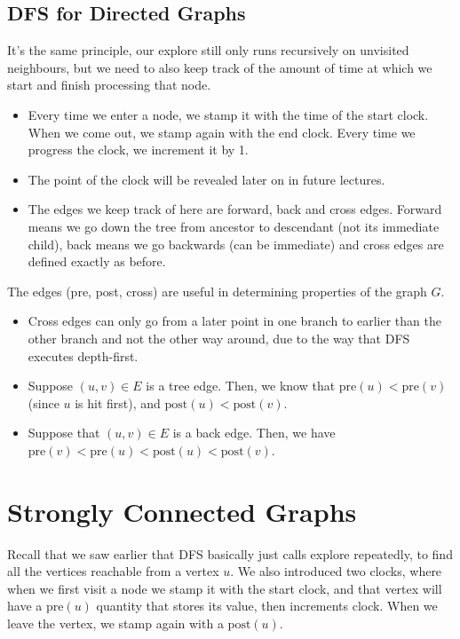 \documentclass[10pt]{article}
\newcommand{\pre}{\mathrm{pre}}
\newcommand{\post}{\mathrm{post}}
\begin{document}
	\subsection{DFS for Directed Graphs}
	It's the same principle, our explore still only runs recursively on unvisited neighbours, but we need 
	to also keep track of the amount of time at which we start and finish processing that node.
	\begin{itemize}
		\item Every time we enter a node, we stamp it with the time of the start clock. When we come 
			out, we stamp again with the end clock. Every time we progress the clock, we increment it by 1.
		\item The point of the clock will be revealed later on in future lectures. 
		\item The edges we keep track of here are forward, back and cross edges. Forward means we go 
			down the tree from ancestor to descendant (not its immediate child), back means we go backwards 
			(can be immediate) and cross edges are defined exactly as before.
	\end{itemize}
	The edges (pre, post, cross) are useful in determining properties of the graph $G$. 
	\begin{itemize}
		\item Cross edges can only go from a later point in one branch to earlier than the other branch
			and not the other way around, due to the way that DFS executes depth-first.
		\item Suppose $(u, v) \in E$ is a tree edge. Then, we know that $\pre(u) < \pre(v)$ (since $u$ is 
			hit first), and $\post(u) < \post(v)$. 
		\item Suppose that $(u,v)\in E$ is a back edge. Then, we have $\pre(v) < \pre(u) < \post(u) < \post(v)$.
	\end{itemize}

	\section{Strongly Connected Graphs}
	Recall that we saw earlier that DFS basically just calls explore repeatedly, to find all the vertices 
	reachable from a vertex $u$. We also introduced two clocks, where when we first visit a node 
	we stamp it with the start clock, and that vertex will have a $\pre(u)$ quantity that stores its value, 
	then increments clock. When we leave the vertex, we stamp again with a $\post(u)$. 
\end{document}
